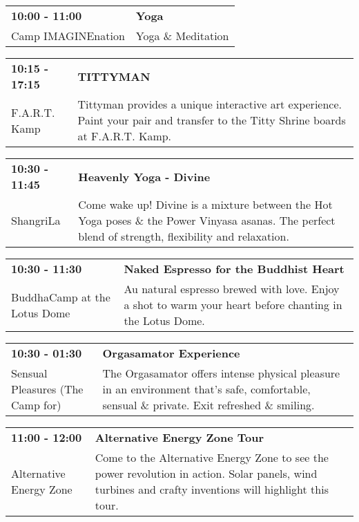 \begin{tabular}{ p{1in} p{2.2in} }
    \textbf{10:00 - 11:00} & \textbf{Yoga} \\
    Camp IMAGINEnation \newline  & Yoga \& Meditation \\
    \hline 
\end{tabular}
    
\begin{tabular}{ p{1in} p{2.2in} }
    \textbf{10:15 - 17:15} & \textbf{TITTYMAN} \\
    F.A.R.T. Kamp \newline  & Tittyman provides a unique interactive art experience. Paint your pair and transfer to the Titty Shrine boards at F.A.R.T. Kamp. \\
    \hline 
\end{tabular}
    
\begin{tabular}{ p{1in} p{2.2in} }
    \textbf{10:30 - 11:45} & \textbf{Heavenly Yoga - Divine} \\
    ShangriLa \newline  & Come wake up! Divine is a mixture between the Hot Yoga poses \& the Power Vinyasa asanas. The perfect blend of strength, flexibility and relaxation. \\
    \hline 
\end{tabular}
    
\begin{tabular}{ p{1in} p{2.2in} }
    \textbf{10:30 - 11:30} & \textbf{Naked Espresso for the Buddhist Heart} \\
    BuddhaCamp at the Lotus Dome \newline  & Au natural espresso brewed with love.  Enjoy a shot to warm your heart before  chanting in the Lotus Dome. \\
    \hline 
\end{tabular}
    
\begin{tabular}{ p{1in} p{2.2in} }
    \textbf{10:30 - 01:30} & \textbf{Orgasamator Experience} \\
    Sensual Pleasures (The Camp for) \newline  & The Orgasamator offers intense physical pleasure in an environment that's safe, comfortable, sensual \& private.  Exit refreshed \& smiling. \\
    \hline 
\end{tabular}
    
\begin{tabular}{ p{1in} p{2.2in} }
    \textbf{11:00 - 12:00} & \textbf{Alternative Energy Zone Tour} \\
    Alternative Energy Zone \newline  & Come to the Alternative Energy Zone to see the power revolution in action. Solar panels, wind turbines and crafty inventions will highlight this tour. \\
    \hline 
\end{tabular}
    
